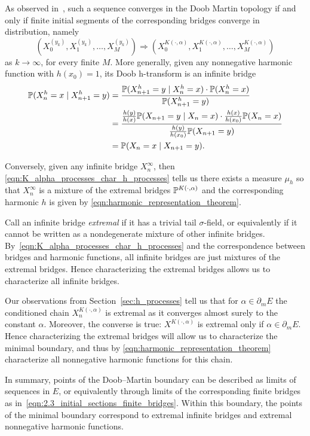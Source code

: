 \begin{subappendices}
\noindent As observed in~\cite{follmer1975_phase_transition_martin_boundary}, such a sequence converges in the Doob
Martin topology if and only if finite initial segments of the corresponding bridges converge
 in distribution, namely
 \begin{equation}
    (X^{(y_k)}_0, X^{(y_k)}_1, \ldots, X^{(y_k)}_M) \Rightarrow (X^{K(\cdot, \alpha)}_0, X^{K(\cdot, \alpha)}_1, \ldots, X^{K(\cdot, \alpha)}_M)
    \label{eqn:2.3_initial_sections_finite_bridges}
\end{equation}
   as $k \to \infty$, for every finite $M$. More generally, given any nonnegative harmonic
   function with $h(x_0) = 1$, its Doob h-transform is an infinite bridge
        \begin{align*}
        \P(X^h_n = x \; | \; X^h_{n+1} = y) & = \frac{\P(X^h_{n+1} = y \; | \; X^h_{n} = x) \cdot \P(X^h_n = x)}{\P(X^h_{n+1} = y)} \\
        & = \frac{\frac{h(y)}{h(x)}\P(X_{n+1} = y \; | \; X_{n} = x) \cdot \frac{h(x)}{h(x_0)}\P(X_n = x)}{\frac{h(y)}{h(x_0)}\P(X_{n+1} = y)} \\
        & = \P(X_n = x \; | \; X_{n+1} = y).
        \end{align*}


\noindent Conversely, given any infinite bridge $X^\infty_n$, then
\eqref{eqn:K_alpha_processes_char_h_processes} tells us there
 exists a measure $\mu_h$ so that $X^\infty_n$ is a mixture of the extremal
  bridges $\P^{K(\cdot, \alpha)}$ and the corresponding harmonic $h$ is given by
  \eqref{eqn:harmonic_representation_theorem}.
%

Call an infinite bridge \textit{extremal} if it has a trivial tail
$\sigma$-field, or equivalently if it cannot be written as a nondegenerate
mixture of other infinite bridges. By~\eqref{eqn:K_alpha_processes_char_h_processes}
and the correspondence between bridges and
harmonic functions, all infinite bridges are just mixtures of the extremal
bridges. Hence characterizing the extremal bridges allows us to
characterize all infinite bridges.

Our observations from Section~\ref{sec:h_processes} tell us that for $\alpha \in \partial_m E$
the conditioned chain $X_n^{K(\cdot, \alpha)}$ is extremal as it converges almost
 surely to the constant $\alpha$. Moreover, the converse is true: $X^{K(\cdot, \alpha)}$
 is extremal only if $\alpha \in \partial_m E$. Hence characterizing the extremal
 bridges will allow us to characterize the minimal boundary, and thus by
 \eqref{eqn:harmonic_representation_theorem} characterize all nonnegative
  harmonic functions for this chain.

In summary, points of the Doob--Martin boundary can be described as limits of
sequences in $E$, or equivalently through limits of the corresponding finite
bridges as in~\eqref{eqn:2.3_initial_sections_finite_bridges}. Within this
boundary, the points of the minimal boundary correspond to extremal infinite
bridges and extremal nonnegative harmonic functions.



\end{subappendices}
